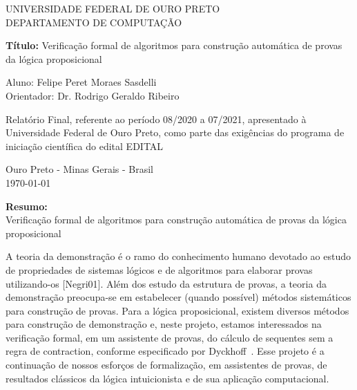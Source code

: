 \documentclass[paper=a4, fontsize=12pt]{article}
\theoremstyle{definition}
\begin{document}
\begin{center}
  UNIVERSIDADE FEDERAL DE OURO PRETO \\
  DEPARTAMENTO DE COMPUTAÇÃO\\
\end{center}
\vspace{2cm}

\begin{center}
{\bf\Large Título:} \Large{Verificação formal de algoritmos para construção automática de provas da lógica proposicional}
\end{center}
\vspace{4cm}
\begin{flushleft}
Aluno: Felipe Peret Moraes Sasdelli\\
Orientador: Dr. Rodrigo Geraldo Ribeiro\\
\end{flushleft}
\vspace{4cm}
\noindent
Relatório Final, referente ao período 08/2020 a 07/2021, apresentado à
Universidade Federal de Ouro Preto, como parte das exigências do
programa de iniciação científica do edital EDITAL
\vspace{1cm}
\begin{center}
Ouro Preto - Minas Gerais - Brasil\\
\today
\end{center}

\clearpage

\begin{center}
{\bf\Large Resumo:}\\ \Large{Verificação formal de algoritmos para construção automática de provas da lógica proposicional}
\end{center}

\vspace{1cm}

A teoria da demonstração é o ramo do conhecimento humano devotado ao estudo de
propriedades de sistemas lógicos e de algoritmos para elaborar provas
utilizando-os [Negri01]. Além dos estudo da estrutura de provas, a
teoria da demonstração preocupa-se em estabelecer (quando possível) métodos
sistemáticos para construção de provas. Para a lógica proposicional, existem
diversos métodos para construção de demonstração e, neste projeto, estamos
interessados na verificação formal, em um assistente de provas, do cálculo de
sequentes sem a regra de contraction, conforme especificado por Dyckhoff~\cite{Dychoff92}.
Esse projeto é a continuação de nossos esforços de formalização, em assistentes de provas,
de resultados clássicos da lógica intuicionista e de sua aplicação computacional.
\end{document}
